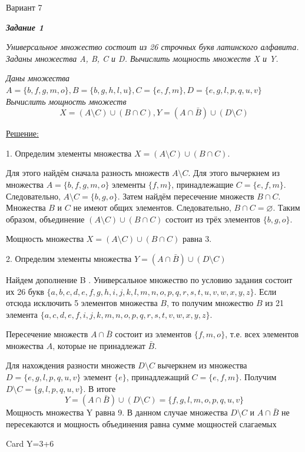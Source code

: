 \documentclass[11pt]{article}
\let\emptyset\varnothing
\begin{document}
	\begin{center}
	Вариант 7
	\end{center}
	
	\textit{\textbf{Задание 1}}

	\textit{Универсальное множество состоит из 26 строчных букв латинского
алфавита. Заданы множества A, B, C и D. Вычислить мощность множеств X
и Y.}

\textit{Даны множества
$A=\{b,f,g,m,o\}, B=\{b,g,h,l,u\}, C=\{e,f,m\}, D=\{e,g,l,p,q,u,v\}$\\
Вычислить мощность множеств}
$$X = (A \setminus C) \cup (B \cap C),
Y=(A \cap \bar B) \cup (D \setminus C) $$

\underline{Решение:}

1. Определим элементы множества 
$X = (A \setminus C) \cup (B \cap C)$.

Для этого найдём сначала разность множеств $A \setminus C$.
Для этого вычеркнем из множества $A=\{b,f,g,m,o\}$ элементы
$\{f, m\}$, принадлежащие $C=\{e,f,m\}$. Следовательно,
$A \setminus C = \{b, g, o\}$.
Затем найдём пересечение множеств $B \cap C$.
Множества $B$ и $C$ не имеют общих элементов. Следовательно,
$B \cap C = \emptyset$.
Таким образом, объединение $(A \setminus C) \cup (B \cap C)$ состоит из
трёх элементов $\{b, g, o\}$.

Мощность множества 
$X = (A \setminus C) \cup (B \cap C)$ равна 3.

2. Определим элементы множества 
$Y=(A \cap \bar B) \cup (D \setminus C)$

Найдем дополнение B . Универсальное множество по условию задания
состоит их 26 букв
$\{a,b,c,d,e,f,g,h,i,j,k,l,m,n,o,p,q,r,s,t,u,v,w,x,y,z\}$.
Если отсюда исключить 5 элементов множества $B$, то получим множество
$B$ из 21 элемента
$\{a,c,d,e,f,i,j,k,m,n,o,p,q,r,s,t,v,w,x,y,z\}$.

Пересечение множеств $A \cap \bar B$
состоит из элементов $\{f, m, o\}$, т.е. всех
элементов множества $A$, которые не принадлежат $\bar B$.

Для нахождения разности множеств $D \setminus C$ вычеркнем из множества
$D=\{e,g,l,p,q,u,v\}$
элемент $\{e\}$, принадлежащий
$C=\{e,f,m\}$. Получим
$D \setminus C = \{g, l, p, q, u, v\}$. В итоге\\
$$Y=(A \cap \bar B) \cup (D \setminus C) = \{f,g,l,m,o,p,q,u,v\}$$
Мощность множества Y равна 9. В данном случае множества $D \setminus C$
и $A \cap \bar B$ не пересекаются и мощность объединения равна
сумме мощностей слагаемых

Card Y=3+6
\end{document}
